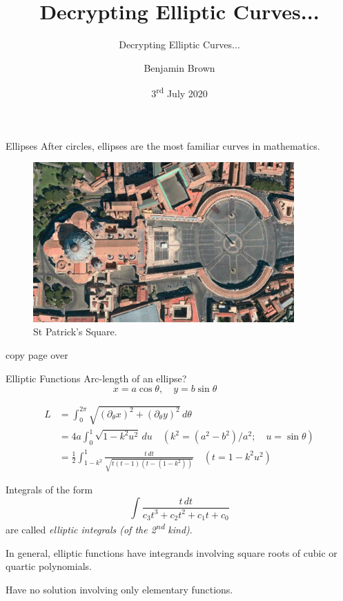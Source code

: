 \documentclass{beamer}
\title[]{Decrypting Elliptic Curves...}
\subtitle{Decrypting Elliptic Curves...}
\author{Benjamin Brown}
\date{3\textsuperscript{rd} July 2020}
\begin{document}
\begin{frame}
  \titlepage
\end{frame}

\begin{frame}[t]{Ellipses}
	After circles, ellipses are the most familiar curves in mathematics.
	\begin{figure}[h]
		\centering
		\includegraphics[width=10cm]{st-patricks-square}
		\caption{St Patrick's Square.}
	\end{figure}
\end{frame}

\begin{frame}	
	copy page over
\end{frame}

\begin{frame}[t]{Elliptic Functions}
	Arc-length of an ellipse?
\begin{equation*}
	x = a\cos\theta,\quad y=b\sin\theta\quad \quad \quad 
\end{equation*}
	
\begin{equation*}
	\begin{split}
		L &= \int_{0}^{2\pi} \sqrt{ ( \partial_{\theta}x )^{2} + ( \partial_{\theta}y )^{2} }\, d\theta \\
		&= 4a \int_{0}^{1} \sqrt{ 1 - k^{2} u^{2} }\, du \quad (k^{2} = (a^{2} - b^{2})/a^{2};\quad u = \sin\theta ) \\
		&= \frac{1}{2} \int_{1-k^{2}}^{1} \frac{t\, dt}{\sqrt{t(t-1)(t - (1-k^{2}))}}\quad (t = 1 - k^{2}u^{2})
	\end{split}
\end{equation*}	
\end{frame}

\begin{frame}
	Integrals of the form
	\begin{equation*}
		\int \frac{t\, dt}{c_{3}t^{3} + c_{2}t^{2} + c_{1}t + c_{0}}
	\end{equation*}
	are called \emph{elliptic integrals (of the 2\textsuperscript{nd} kind)}.
	
	In general, elliptic functions have integrands involving square roots of cubic or quartic polynomials. 
	
	Have no solution involving only elementary functions.
\end{frame}
\end{document}
